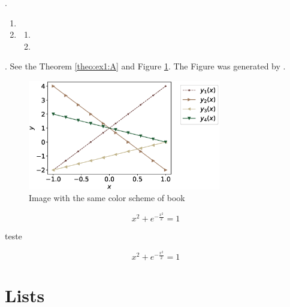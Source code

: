 \lipsum[1][1-3].
\begin{enumerate}
\item \lipsum[1][1-2]
\item \lipsum[1][1-2]
\begin{enumerate}
\item \lipsum[1][1-2]
\item \lipsum[1][1-2]
\end{enumerate}
\end{enumerate}
\lipsum[1][1-3]. See the Theorem \ref{theo:ex1:A} and Figure \ref{fig:exemplo}.
The Figure was generated by .

\begin{figure}[htbp] %
  \centering          %
  \includegraphics[width=0.75\textwidth]{chapters/cap1/python/example.eps}
  \caption{Image with the same color scheme of book} %
  \label{fig:exemplo} %
\end{figure}


\begin{theorem}
\label{theo:ex1:A}
\lipsum[1][1-3]
\begin{equation}
x^2+e^{-\frac{x^2}{2}}=1
\end{equation}
\end{theorem}

teste

\begin{proofraw}
\lipsum[1][1-3]
\begin{equation}
x^2+e^{-\frac{x^2}{2}}=1
\end{equation}
\end{proofraw}
\section{Lists}


